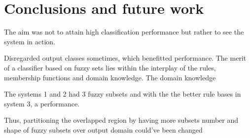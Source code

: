 \section{Conclusions and future work}

The aim was not to attain high classification performance but rather to see the system in action. 

Disregarded output classes sometimes, which benefitted performance.
The merit of a classifier based on fuzzy sets lies within the interplay of the rules, membership functions and domain knowledge. The domain knowledge 

The systems 1 and 2 had 3 fuzzy subsets and with the the better rule bases in system 3, a performance.

Thus, partitioning the overlapped region by having more subsets 
%
number and shape of fuzzy subsets over output domain could've been changed